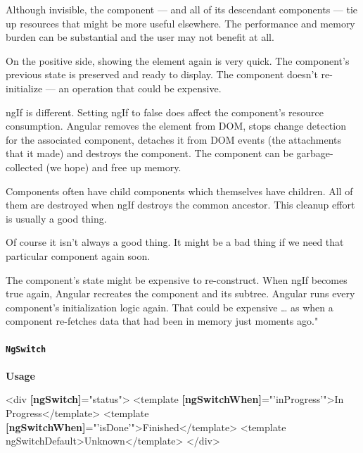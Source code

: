 \documentclass[12pt,]{article}
\newenvironment{Shaded}{}{}
\newcommand{\KeywordTok}[1]{\textcolor[rgb]{0.00,0.00,1.00}{{#1}}}
\newcommand{\StringTok}[1]{\textcolor[rgb]{0.00,0.50,0.50}{{#1}}}
\newcommand{\OtherTok}[1]{\textcolor[rgb]{1.00,0.25,0.00}{{#1}}}
\newcommand{\ErrorTok}[1]{\textcolor[rgb]{1.00,0.00,0.00}{\textbf{{#1}}}}
\newcommand{\NormalTok}[1]{{#1}}
\let\oldparagraph\paragraph
\renewcommand{\paragraph}[1]{\oldparagraph{#1}\mbox{}}
\begin{document}
Although invisible, the component --- and all of its descendant
components --- tie up resources that might be more useful elsewhere. The
performance and memory burden can be substantial and the user may not
benefit at all.

On the positive side, showing the element again is very quick. The
component's previous state is preserved and ready to display. The
component doesn't re-initialize --- an operation that could be
expensive.

ngIf is different. Setting ngIf to false does affect the component's
resource consumption. Angular removes the element from DOM, stops change
detection for the associated component, detaches it from DOM events (the
attachments that it made) and destroys the component. The component can
be garbage-collected (we hope) and free up memory.

Components often have child components which themselves have children.
All of them are destroyed when ngIf destroys the common ancestor. This
cleanup effort is usually a good thing.

Of course it isn't always a good thing. It might be a bad thing if we
need that particular component again soon.

The component's state might be expensive to re-construct. When ngIf
becomes true again, Angular recreates the component and its subtree.
Angular runs every component's initialization logic again. That could be
expensive \ldots{} as when a component re-fetches data that had been in
memory just moments ago."

\paragraph{\texorpdfstring{\texttt{NgSwitch}}{NgSwitch}}\label{ngswitch}

\textbf{Usage}

\begin{Shaded}
\begin{Highlighting}[numbers=left,,]
\KeywordTok{<div} \ErrorTok{[ngSwitch]}\OtherTok{=}\StringTok{"status"}\KeywordTok{>}
  \KeywordTok{<template} \ErrorTok{[ngSwitchWhen]}\OtherTok{=}\StringTok{"'inProgress'"}\KeywordTok{>}\NormalTok{In Progress}\KeywordTok{</template>}
  \KeywordTok{<template} \ErrorTok{[ngSwitchWhen]}\OtherTok{=}\StringTok{"'isDone'"}\KeywordTok{>}\NormalTok{Finished}\KeywordTok{</template>}
  \KeywordTok{<template}\OtherTok{ ngSwitchDefault}\KeywordTok{>}\NormalTok{Unknown}\KeywordTok{</template>}
\KeywordTok{</div>}
\end{Highlighting}
\end{Shaded}
\end{document}
